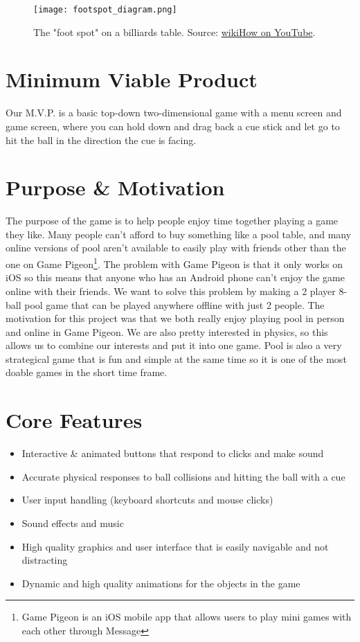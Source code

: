 \documentclass[12pt]{article}
\begin{document}
\FloatBarrier
\begin{figure}[htbp]
    \centering
    \texttt{[image: footspot\_diagram.png]}
    \caption{The "foot spot" on a billiards table. Source: \href{https://www.youtube.com/watch?v=lmfKI01S-ws&ab_channel=wikiHow}{wikiHow on YouTube}.}
    \label{fig:footspot}
\end{figure}
\FloatBarrier

\section{Minimum Viable Product}

Our M.V.P. is a basic top-down two-dimensional game with a menu screen and game screen, where you can hold down and drag back a cue stick and let go to hit the ball in the direction the cue is facing.

\section{Purpose \& Motivation}

The purpose of the game is to help people enjoy time together playing a game they like. Many people can't afford to buy something like a pool table, and many online versions of pool aren't available to easily play with friends other than the one on Game Pigeon\protect\footnote{ Game Pigeon is an iOS mobile app that allows users to play mini games with each other through Message}. The problem with Game Pigeon is that it only works on iOS so this means that anyone who has an Android phone can't enjoy the game online with their friends. We want to solve this problem by making a 2 player 8-ball pool game that can be played anywhere offline with just 2 people. The motivation for this project was that we both really enjoy playing pool in person and online in Game Pigeon. We are also pretty interested in physics, so this allows us to combine our interests and put it into one game. Pool is also a very strategical game that is fun and simple at the same time so it is one of the most doable games in the short time frame.

\bigskip

\section{Core Features}

\begin{itemize}
    \item Interactive \& animated buttons that respond to clicks and make sound
    \item Accurate physical responses to ball collisions and hitting the ball with a cue
    \item User input handling (keyboard shortcuts and mouse clicks)
    \item Sound effects and music
    \item High quality graphics and user interface that is easily navigable and not distracting
    \item Dynamic and high quality animations for the objects in the game
\end{itemize}
\end{document}
